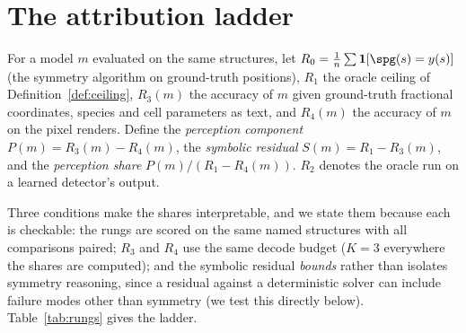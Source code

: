\section{The attribution ladder}
\label{sec:attribution}

\begin{definition}
\label{def:ladder}
For a model $m$ evaluated on the same structures, let
$R_0 = \tfrac{1}{n}\sum \mathbf{1}[\spg(s) = y(s)]$ (the symmetry algorithm on ground-truth positions),
$R_1$ the oracle ceiling of Definition~\ref{def:ceiling},
$R_3(m)$ the accuracy of $m$ given ground-truth fractional coordinates, species and cell parameters as
text, and
$R_4(m)$ the accuracy of $m$ on the pixel renders. Define the \emph{perception component}
$P(m) = R_3(m) - R_4(m)$, the \emph{symbolic residual} $S(m) = R_1 - R_3(m)$, and the \emph{perception
share} $P(m) / (R_1 - R_4(m))$. $R_2$ denotes the oracle run on a learned detector's output.
\end{definition}

Three conditions make the shares interpretable, and we state them because each is checkable: the rungs are
scored on the same named structures with all comparisons paired; $R_3$ and $R_4$ use the same decode budget
($K{=}3$ everywhere the shares are computed); and the symbolic residual \emph{bounds} rather than isolates
symmetry reasoning, since a residual against a deterministic solver can include failure modes other than
symmetry (we test this directly below). Table~\ref{tab:rungs} gives the ladder.

